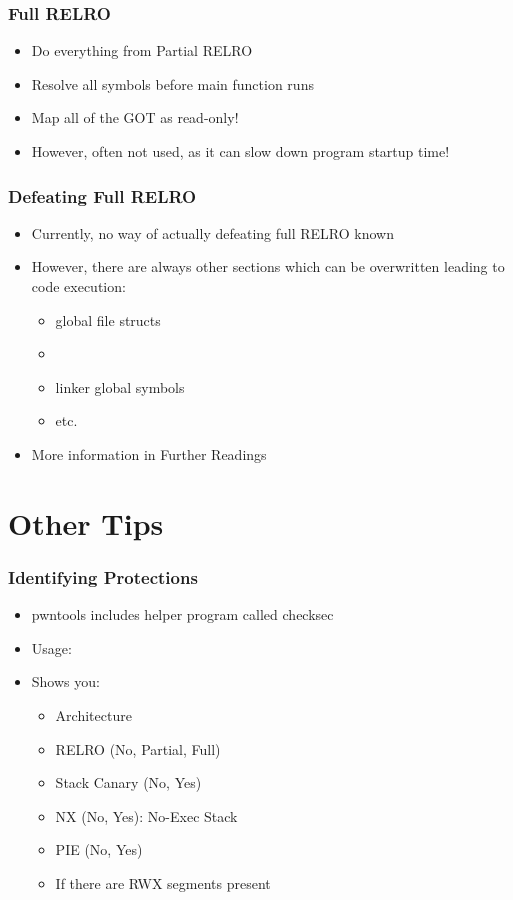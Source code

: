 \documentclass[aspectratio=169]{beamer}
\begin{document}
{\begin{frame}
    \frametitle{Full RELRO}
    \begin{itemize}
        \item Do everything from Partial RELRO
        \item Resolve all symbols before main function runs
        \item Map all of the GOT as read-only!
        \item However, often not used, as it can slow down program startup time!
    \end{itemize}
\end{frame}

\begin{frame}[fragile]
    \frametitle{Defeating Full RELRO}
    \begin{itemize}
        \item Currently, no way of actually defeating full RELRO known
        \item However, there are always other sections which can be overwritten leading to code execution:
        \begin{itemize}
            \item global file structs
            \item {}
            \item linker global symbols
            \item etc.
        \end{itemize}
        \item More information in Further Readings
    \end{itemize}

\end{frame}
}

\section{Other Tips}

\begin{frame}[fragile]
    \frametitle{Identifying Protections}
    \begin{itemize}
        \item pwntools includes helper program called checksec
        \item Usage: 
        \item Shows you:
        \begin{itemize}
            \item Architecture
            \item RELRO (No, Partial, Full)
            \item Stack Canary (No, Yes)
            \item NX (No, Yes): No-Exec Stack
            \item PIE (No, Yes)
            \item If there are RWX segments present
        \end{itemize}
    \end{itemize}

\end{frame}
\end{document}
